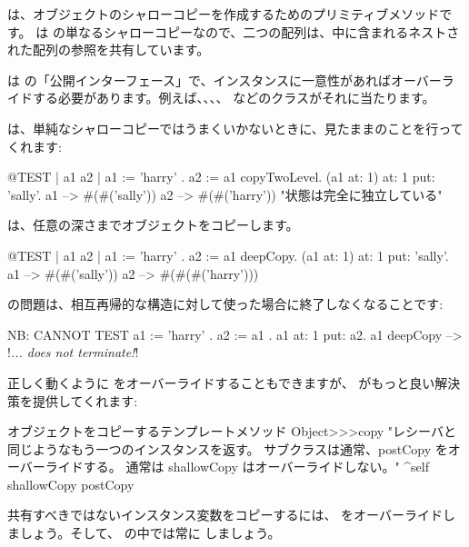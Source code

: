 \documentclass[a4paper,10pt,twoside]{book}
\begin{document}
 は、オブジェクトのシャローコピーを作成するためのプリミティブメソッドです。 は  の単なるシャローコピーなので、二つの配列は、中に含まれるネストされた配列の参照を共有しています。%

 は  の「公開インターフェース」で、インスタンスに一意性があればオーバーライドする必要があります。例えば、、、、 などのクラスがそれに当たります。

 は、単純なシャローコピーではうまくいかないときに、見たままのことを行ってくれます:

\begin{code}{@TEST | a1 a2 |}
a1 := { { 'harry' } } .
a2 := a1 copyTwoLevel.
(a1 at: 1) at: 1 put: 'sally'.
a1 --> #(#('sally'))
a2 --> #(#('harry'))    "状態は完全に独立している"
\end{code}

 は、任意の深さまでオブジェクトをコピーします。

\begin{code}{@TEST | a1 a2 |}
a1 := { { { 'harry' } } } .
a2 := a1 deepCopy.
(a1 at: 1) at: 1 put: 'sally'.
a1 --> #(#('sally'))
a2 --> #(#(#('harry')))
\end{code}

 の問題は、相互再帰的な構造に対して使った場合に終了しなくなることです:

\begin{code}{NB: CANNOT TEST}
a1 := { 'harry' }.
a2 := { a1 }.
a1 at: 1 put: a2.
a1 deepCopy --> !\emph{... does not terminate!}!%
\end{code}

正しく動くように  をオーバーライドすることもできますが、 がもっと良い解決策を提供してくれます:

\begin{method}{オブジェクトをコピーするテンプレートメソッド}
Object>>>copy
    "レシーバと同じようなもう一つのインスタンスを返す。
    サブクラスは通常、postCopy をオーバーライドする。
    通常は shallowCopy はオーバーライドしない。"
    ^self shallowCopy postCopy
\end{method}

共有すべきではないインスタンス変数をコピーするには、 をオーバーライドしましょう。そして、 の中では常に  しましょう。
\end{document}

